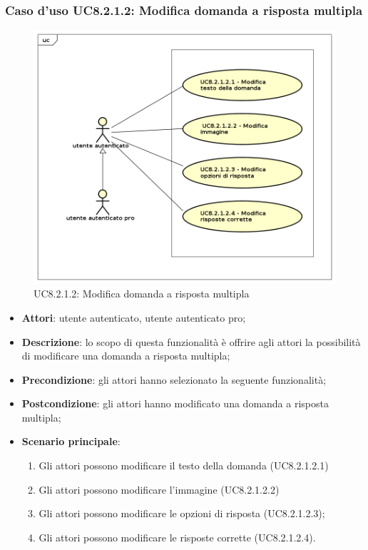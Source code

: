 \subsubsection{Caso d'uso UC8.2.1.2: Modifica domanda a risposta multipla}
	\label{UC8.2.1.2}
	\begin{figure}[h]
		\centering
			\includegraphics[scale=0.45,keepaspectratio]{UML/UC8_2_1_2.png}
		\caption{UC8.2.1.2: Modifica domanda a risposta multipla}
	\end{figure}
	\FloatBarrier
	\begin{itemize}
		\item
			\textbf{Attori}: utente autenticato, utente autenticato pro;
		\item		
			\textbf{Descrizione}: lo scopo di questa funzionalità è offrire agli attori la possibilità di modificare una domanda a risposta multipla;
		\item
			\textbf{Precondizione}: gli attori hanno selezionato la seguente funzionalità; 
		\item
			\textbf{Postcondizione}: gli attori hanno modificato una domanda a risposta multipla;
		\item
			\textbf{Scenario principale}:
	       		\begin{enumerate}
	       			\item
	       			Gli attori possono modificare il testo della domanda (UC8.2.1.2.1)
	       			\item
	       			Gli attori possono modificare l'immagine (UC8.2.1.2.2)
	       			\item
	       			Gli attori possono modificare le opzioni di risposta (UC8.2.1.2.3);
					\item
					Gli attori possono modificare le risposte corrette (UC8.2.1.2.4).
	 			\end{enumerate}
	\end{itemize}

